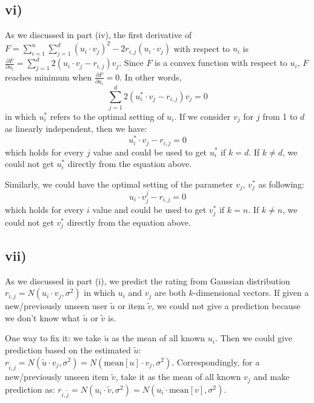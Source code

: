 \documentclass[twoside,11pt]{homework}
\begin{document}
\subsection*{vi)}
As we discussed in part (iv), the first derivative of $F = \sum\limits_{i=1}^n \sum\limits_{j=1}^d (u_i \cdot v_j)^2 - 2r_{i, j} (u_i \cdot v_j)$ with respect to $u_i$ is $\frac{\partial F}{\partial u_i} = \sum\limits_{j=1}^d 2(u_i \cdot v_j- r_{i, j})  v_j$.
Since $F$ is a convex function with respect to $u_i$, $F$ reaches minimum when $\frac{\partial F}{\partial u_i} = 0$.
In other words,
%
\begin{equation}
\sum\limits_{j=1}^d 2(u_i^* \cdot v_j- r_{i, j})  v_j = 0
\end{equation}
%
in which $u_i^*$ refers to the optimal setting of $u_i$.
If we consider $v_j$ for $j$ from 1 to $d$ as linearly independent, then we have:
%
\begin{equation}
u_i^* \cdot v_j- r_{i, j} = 0
\end{equation}
%
which holds for every $j$ value and could be used to get  $u_i^*$ if $k = d$.
If $k \neq d$, we could not get $u_i^*$ directly from the equation above.

Similarly, we could have the optimal setting of the parameter $v_j$, $v_j^*$ as following:
%
\begin{equation}
u_i \cdot v_j^j- r_{i, j} = 0
\end{equation}
%
which holds for every $i$ value and could be used to get  $v_j^*$ if $k = n$.
If $k \neq n$, we could not get $v_j^*$ directly from the equation above.

\subsection*{vii)}
As we discussed in part (i), we predict the rating from Gaussian distribution $r_{i, j} = N(u_i \cdot v_j, \sigma^2)$ in which $u_i$ and $v_j$ are both $k$-dimensional vectors.
If given a new/previously unseen user $\tilde{u}$ or item $\tilde{v}$, we could not give a prediction because we don't know what $\tilde{u}$ or $\tilde{v}$ is.

One way to fix it: we take $\tilde{u}$ as the mean of all known $u_i$. 
Then we could give prediction based on the estimated  $\tilde{u}$: $r_{\tilde{i}, j} = N(\tilde{u} \cdot v_j, \sigma^2) = N(\mathrm{mean}[u] \cdot v_j, \sigma^2)$.
Correspondingly, for a new/previously unseen item $\tilde{v}$, take it as the mean of all known $v_j$ and make prediction as: $r_{i, \tilde{j}} = N(u_i \cdot \tilde{v}, \sigma^2) = N(u_i \cdot \mathrm{mean}[v], \sigma^2)$.
\end{document}
